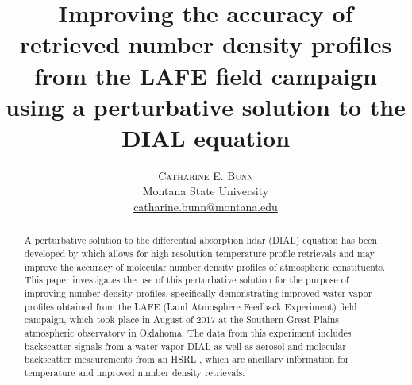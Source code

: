 \documentclass[twoside]{article}
\title{\vspace{-15mm}\fontsize{18pt}{10pt}\selectfont\textbf{Improving the accuracy of retrieved number density profiles from the LAFE field campaign using a perturbative solution to the DIAL equation}} %
\author{
\large
\textsc{Catharine E. Bunn}\\[2mm] %
\normalsize Montana State University \\ %
\normalsize \href{mailto:catharine.bunn@montana.edu}{catharine.bunn@montana.edu} %
\vspace{-5mm}
}
\date{}
\begin{document}
\maketitle %

\thispagestyle{fancy} %




\begin{abstract}
\noindent A perturbative solution to the differential absorption lidar (DIAL) equation has been developed by \citet{Bunn2018} which allows for high resolution temperature profile retrievals and may improve the accuracy of molecular number density profiles of atmospheric constituents.
This paper investigates the use of this perturbative solution for the purpose of improving number density profiles, specifically demonstrating improved water vapor profiles obtained from the LAFE (Land Atmosphere Feedback Experiment) field campaign, which took place in August of 2017 at the Southern Great Plains atmospheric observatory in Oklahoma.
The data from this experiment includes backscatter signals from a water vapor DIAL as well as aerosol and molecular backscatter measurements from an HSRL \cite{Hayman2017}, which are ancillary information for temperature and improved number density retrievals.
\end{abstract}
\end{document}
